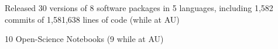 \begin{veryTightItemize}
    \item Released 30 versions of 8 software packages in 5 languages, including 
        1,582 commits of 1,581,638 lines of code (while at AU)
    \item 10 Open-Science Notebooks (9 while at AU)
\end{veryTightItemize}
